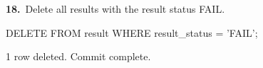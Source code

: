\noindent\begin{minipage}{\linewidth}
\begingroup{}
{\fontsize{14}{17}\selectfont\textbf{18.}}\ Delete all results with the result status FAIL.\par
\endgroup\vspace{12pt}


\begin{sqlcode}
DELETE FROM result WHERE result_status = 'FAIL';
\end{sqlcode}

\vspace{18pt}


\begin{sqlout}[fontsize=\small]
1 row deleted.
Commit complete.
\end{sqlout}
\end{minipage}\par\vspace{24pt}

